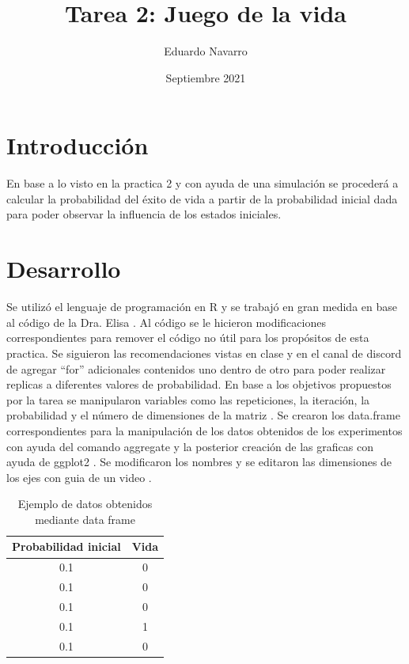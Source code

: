 \documentclass{article}
\title{Tarea 2:
Juego de la vida}
\author{Eduardo Navarro}
\date{Septiembre 2021}
\begin{document}
\maketitle

\section{Introducción}

En base a lo visto en la practica 2 y con ayuda de una simulación se procederá a calcular la probabilidad del éxito de vida a partir de la probabilidad inicial dada para poder observar la influencia de los estados iniciales.

\section{Desarrollo}
Se utilizó el lenguaje de programación en R y se trabajó en gran medida en base al código de la Dra. Elisa \cite{DraElisa}. Al código se le hicieron modificaciones correspondientes para remover el código no útil para los propósitos de esta practica. Se siguieron las recomendaciones vistas en clase y en el canal de discord de agregar “for” adicionales contenidos uno dentro de otro para poder realizar replicas a diferentes valores de probabilidad. En base a los objetivos propuestos por la tarea se manipularon variables como las repeticiones, la iteración, la probabilidad y el número de dimensiones de la matriz \cite {automata}. Se crearon los data.frame correspondientes para la manipulación de los datos obtenidos de los experimentos con ayuda del comando aggregate \cite{youtubeaggregate} y la posterior creación de las graficas con ayuda de ggplot2 \cite{hadley}. Se modificaron los nombres y se editaron las dimensiones de los ejes con guia de un video \cite{youtubePlot}.


\begin{table}[h!]
\begin{center}
\begin{tabular}{|c|c|}
\hline
Probabilidad inicial & Vida \\ \hline
0.1 & 0\\ \hline
0.1 & 0\\ \hline
0.1 & 0\\ \hline
0.1 & 1\\ \hline
0.1 & 0\\ \hline
\end{tabular}
\caption{Ejemplo de datos obtenidos mediante data frame}
\label{Tab:Tabla1}
\end{center}
\end{table}
\end{document}

